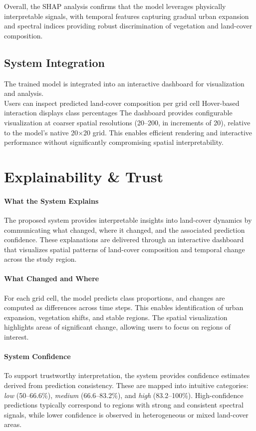 \documentclass[11pt]{article}
\begin{document}
Overall, the SHAP analysis confirms that the model leverages physically interpretable signals, with temporal features capturing gradual urban expansion and spectral indices providing robust discrimination of vegetation and land-cover composition.


\subsection{System Integration}
The trained model is integrated into an interactive dashboard for visualization and analysis. \\
Users can inspect predicted land-cover composition per grid cell
Hover-based interaction displays class percentages
The dashboard provides configurable visualization at coarser spatial resolutions (20–200, in increments of 20), relative to the model’s native 20×20 grid. This enables efficient rendering and interactive performance without significantly compromising spatial interpretability.

\section{Explainability \& Trust}

\paragraph{What the System Explains}
The proposed system provides interpretable insights into land-cover dynamics by communicating what changed, where it changed, and the associated prediction confidence. These explanations are delivered through an interactive dashboard that visualizes spatial patterns of land-cover composition and temporal change across the study region.

\paragraph{What Changed and Where}
For each grid cell, the model predicts class proportions, and changes are computed as differences across time steps. This enables identification of urban expansion, vegetation shifts, and stable regions. The spatial visualization highlights areas of significant change, allowing users to focus on regions of interest.

\paragraph{System Confidence}
To support trustworthy interpretation, the system provides confidence estimates derived from prediction consistency. These are mapped into intuitive categories: \textit{low} (50–66.6\%), \textit{medium} (66.6–83.2\%), and \textit{high} (83.2–100\%). High-confidence predictions typically correspond to regions with strong and consistent spectral signals, while lower confidence is observed in heterogeneous or mixed land-cover areas.
\end{document}
